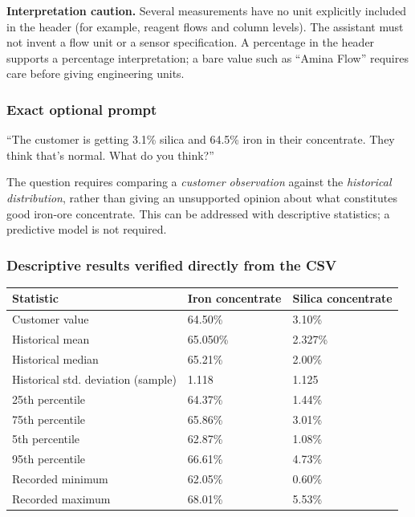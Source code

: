 \documentclass[11pt,a4paper]{article}
\begin{document}
\textbf{Interpretation caution.} Several measurements have no unit explicitly included in the header (for example, reagent flows and column levels). The assistant must not invent a flow unit or a sensor specification. A percentage in the header supports a percentage interpretation; a bare value such as ``Amina Flow'' requires care before giving engineering units.

\subsubsection{Exact optional prompt}
\begin{examplebox}
``The customer is getting 3.1\% silica and 64.5\% iron in their concentrate. They think that's normal. What do you think?''
\end{examplebox}
The question requires comparing a \emph{customer observation} against the \emph{historical distribution}, rather than giving an unsupported opinion about what constitutes good iron-ore concentrate. This can be addressed with descriptive statistics; a predictive model is not required.

\subsubsection{Descriptive results verified directly from the CSV}
\begin{tabularx}{\textwidth}{@{}Y L{29mm}L{29mm}@{}}
\toprule\textbf{Statistic} & \textbf{Iron concentrate} & \textbf{Silica concentrate}\\\midrule
Customer value & 64.50\% & 3.10\%\\
Historical mean & 65.050\% & 2.327\%\\
Historical median & 65.21\% & 2.00\%\\
Historical std. deviation (sample) & 1.118 & 1.125\\
25th percentile & 64.37\% & 1.44\%\\
75th percentile & 65.86\% & 3.01\%\\
5th percentile & 62.87\% & 1.08\%\\
95th percentile & 66.61\% & 4.73\%\\
Recorded minimum & 62.05\% & 0.60\%\\
Recorded maximum & 68.01\% & 5.53\%\\
\bottomrule
\end{tabularx}
\end{document}

